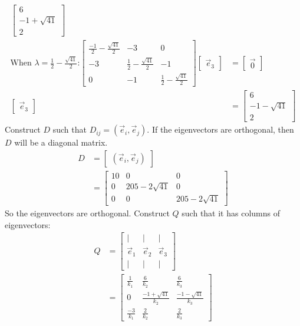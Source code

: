 \documentclass[11pt]{homework}
\begin{document}
\begin{align*}
\begin{bmatrix}
  6 \\  
  -1 + \sqrt{41} \\
  2
  \end{bmatrix} \\
  \text{When $\lambda = \frac{1}{2} - \frac{\sqrt{41}}{2}$:}
  \begin{bmatrix}
  \frac{-1}{2} - \frac{\sqrt{41}}{2} & -3 & 0 \\
  -3 & \frac{1}{2} - \frac{\sqrt{41}}{2} & -1 \\
  0 & -1 & \frac{1}{2} - \frac{\sqrt{41}}{2}
  \end{bmatrix}
  \begin{bmatrix}
    \vec e_3
  \end{bmatrix}
  &= 
  \begin{bmatrix}
    \vec 0
  \end{bmatrix} \\
  \begin{bmatrix}
    \vec e_3
  \end{bmatrix}
  &= 
  \begin{bmatrix}
  6 \\  
  -1 - \sqrt{41} \\
  2
  \end{bmatrix} 
\end{align*}
Construct $D$ such that $D_{ij} = (\vec e_i, \vec e_j)$. 
If the eigenvectors are orthogonal, 
then $D$ will be a diagonal matrix.
\begin{align*}
D &= 
  \begin{bmatrix}
  (\vec e_i, \vec e_j)
  \end{bmatrix} \\
  &=
  \begin{bmatrix}
  10 & 0 & 0 \\ 
  0 & 205-2\sqrt{41} & 0 \\
  0 & 0 & 205 - 2\sqrt{41}
  \end{bmatrix}
\end{align*}
So the eigenvectors are orthogonal.
Construct $Q$ such that it has
columns of eigenvectors:
\begin{align*}
Q &= 
  \begin{bmatrix}
  | & | & |  \\
  \vec e_1 & \vec e_2 & \vec e_3 \\
  | & | & |
  \end{bmatrix}\\
  &=
  \begin{bmatrix}
  \frac{1}{k_1} & \frac{6}{k_2} & \frac{6}{k_3} \\
  0 & \frac{-1+\sqrt{41}}{k_2} & \frac{-1-\sqrt{41}}{k_3} \\
  \frac{-3}{k_1} & \frac{2}{k_2} & \frac{2}{k_3}
  \end{bmatrix}
\end{align*}
\end{document}
